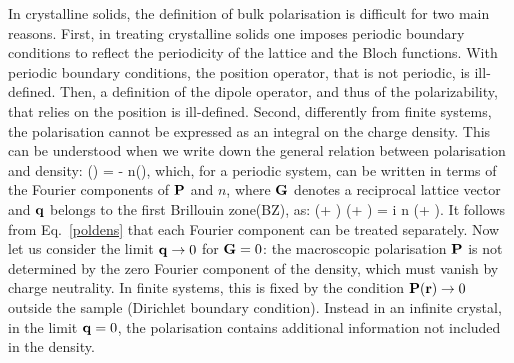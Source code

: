 In crystalline solids, the definition of bulk polarisation is difficult for two main reasons.
First, in treating crystalline solids one imposes periodic boundary conditions to reflect the periodicity of the lattice and the Bloch functions. With periodic boundary conditions, the position operator, that is not periodic, is ill-defined. Then, a definition of the dipole operator, and thus of the polarizability,  that relies on the position is ill-defined.%
 Second, differently from finite systems, the polarisation cannot be expressed as an integral on the charge density\cite{Martin1998}.
This can be understood when we write down the general relation between polarisation and density:
\be
\nabla \cdot \PP(\rr) = - n(\rr),
\ee                              
which, for a periodic system, can be written in terms of the Fourier components of ${\bf P}$ and $n$, where ${\bf G}$ denotes a reciprocal lattice vector and ${\bf q}$ belongs to the first Brillouin zone(BZ), as:
\be
(\qq + \GG) \cdot \PP(\qq + \GG) = i n (\qq + \GG).
\label{poldens}
\ee
It follows from Eq.~\ref{poldens} that each Fourier component can be treated separately. Now let us consider the limit ${\bf q} \rightarrow 0$ for ${\bf G}=0$: the macroscopic polarisation ${\bf P}$ is not determined by the zero Fourier component of the density, which must vanish by charge neutrality. In finite systems, this  is fixed by the condition  ${\bf P}({\bf r}) \rightarrow 0 $ outside the sample (Dirichlet boundary condition). Instead in an infinite crystal, in the limit ${\bf q} = 0$, the polarisation contains additional information not included in the density.\cite{Martin1998} 
